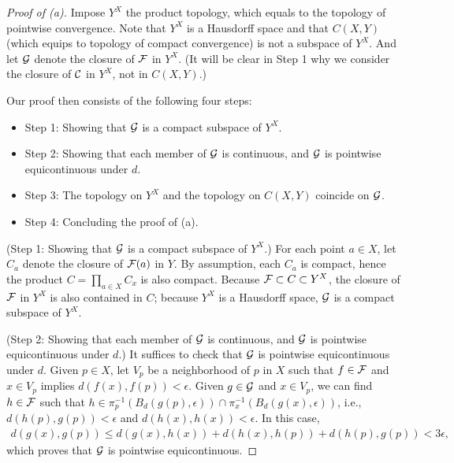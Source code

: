\begin{proof}[Proof of (a)]
    Impose $Y^X$ the product topology, which equals to the topology of pointwise convergence.
    Note that $Y^X$ is a Hausdorff space and that $C(X, Y)$ (which equips to topology of compact convergence) is not a subspace of $Y^X$.
    And let ${\mathcal{G}}$ denote the closure of ${\mathcal{F}}$ in $Y^X$. (It will be clear in Step 1 why we consider the closure of ${\mathcal{C}}$ in $Y^X$, not in $C(X, Y)$.)

    Our proof then consists of the following four steps:
    \begin{itemize}
        \item
        {
            Step 1: Showing that ${\mathcal{G}}$ is a compact subspace of $Y^X$.
        }
        \item
        {
            Step 2: Showing that each member of ${\mathcal{G}}$ is continuous, and ${\mathcal{G}}$ is pointwise equicontinuous under $d$.
        }
        \item
        {
            Step 3: The topology on $Y^X$ and the topology on $C(X, Y)$ coincide on ${\mathcal{G}}$.
        }
        \item
        {
            Step 4: Concluding the proof of (a).
        }
    \end{itemize}

    \noindent(Step 1: Showing that ${\mathcal{G}}$ is a compact subspace of $Y^X$.)\newline\indent
    For each point $a\in X$, let $C_a$ denote the closure of ${\mathcal{F}}(a)$ in $Y$.
    By assumption, each $C_a$ is compact, hence the product $C=\prod_{a\in X} C_x$ is also compact.
    Because ${\mathcal{F}}\subset C\subset Y^X$, the closure of ${\mathcal{F}}$ in $Y^X$ is also contained in $C$; because $Y^X$ is a Hausdorff space, ${\mathcal{G}}$ is a compact subspace of $Y^X$.

    \noindent(Step 2: Showing that each member of ${\mathcal{G}}$ is continuous, and ${\mathcal{G}}$ is pointwise equicontinuous under $d$.)\newline\indent
    It suffices to check that ${\mathcal{G}}$ is pointwise equicontinuous under $d$.
    Given $p\in X$, let $V_p$ be a neighborhood of $p$ in $X$ such that $f\in{\mathcal{F}}$ and $x\in V_p$ implies $d(f(x), f(p))<\epsilon$.
    Given $g\in{\mathcal{G}}$ and $x\in V_p$, we can find $h\in{\mathcal{F}}$ such that $h\in\pi_p^{-1}(B_d(g(p), \epsilon))\cap\pi_x^{-1}(B_d(g(x), \epsilon))$, i.e., $d(h(p), g(p))<\epsilon$ and $d(h(x), h(x))<\epsilon$.
    In this case,
    \begin{align*}
        d(g(x), g(p))\leq d(g(x), h(x))+d(h(x), h(p))+d(h(p), g(p))<3\epsilon,
    \end{align*}
    which proves that ${\mathcal{G}}$ is pointwise equicontinuous.


\end{proof}
